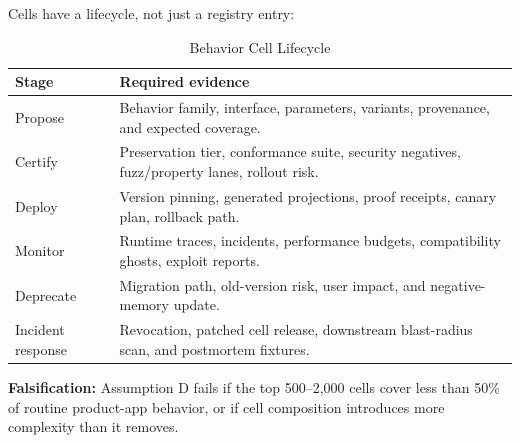 Cells have a lifecycle, not just a registry entry:
\begin{table}[t]
\caption{Behavior Cell Lifecycle}
\label{tab:cell-lifecycle}
\centering
\footnotesize
\begin{tabularx}{\columnwidth}{p{}X}
\toprule
Stage & Required evidence \\
\midrule
Propose & Behavior family, interface, parameters, variants, provenance, and expected coverage. \\
Certify & Preservation tier, conformance suite, security negatives, fuzz/property lanes, rollout risk. \\
Deploy & Version pinning, generated projections, proof receipts, canary plan, rollback path. \\
Monitor & Runtime traces, incidents, performance budgets, compatibility ghosts, exploit reports. \\
Deprecate & Migration path, old-version risk, user impact, and negative-memory update. \\
Incident response & Revocation, patched cell release, downstream blast-radius scan, and postmortem fixtures. \\
\bottomrule
\end{tabularx}
\end{table}

\textbf{Falsification:} Assumption D fails if the top 500--2,000 cells cover less than 50\% of routine product-app behavior, or if cell composition introduces more complexity than it removes.

